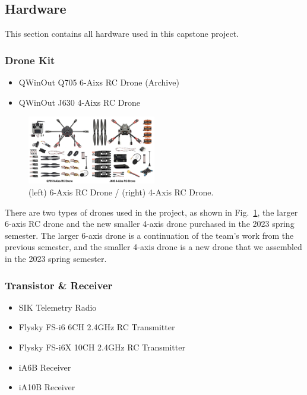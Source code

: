 \subsection{Hardware}\label{subsection:A}
This section contains all hardware used in this capstone project.
    \subsubsection{Drone Kit}\label{subsection:A1}
    \begin{itemize}
        \item QWinOut Q705 6-Aixs RC Drone (Archive)
        \item QWinOut J630 4-Aixs RC Drone
    \end{itemize}

    \begin{figure}[H]
        \centerline{\includegraphics[width=0.5\textwidth]{Figures/Methods/Drone_Kits.png}}
        \caption{(left) 6-Axis RC Drone / (right) 4-Axis RC Drone.}
        \label{fig2a1}
    \end{figure}
    
    There are two types of drones used in the project, as shown in Fig.~\ref{fig2a1}, the larger 6-axis RC drone and the new smaller 4-axis drone purchased in the 2023 spring semester. The larger 6-axis drone is a continuation of the team's work from the previous semester, and the smaller 4-axis drone is a new drone that we assembled in the 2023 spring semester.
    
    \subsubsection{Transistor \& Receiver}\label{subsection:A2}
    \begin{itemize}
        \item SIK Telemetry Radio
        \item Flysky FS-i6   6CH 2.4GHz RC Transmitter
        \item Flysky FS-i6X 10CH 2.4GHz RC Transmitter
        \item iA6B Receiver
        \item iA10B Receiver
    \end{itemize}

